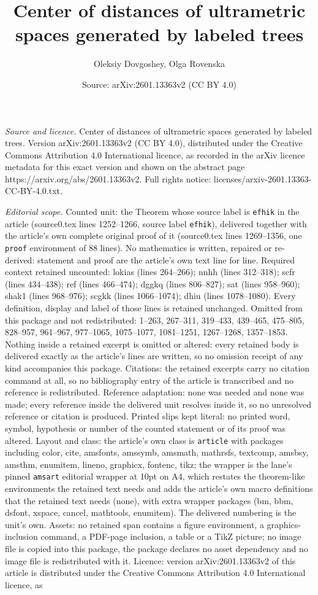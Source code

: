 \documentclass[10pt,a4paper]{amsart}
\title[Center of distances of ultrametric spaces generated by label]{Center of distances of ultrametric spaces generated by labeled trees}
\author{Oleksiy Dovgoshey, Olga Rovenska}
\date{Source: arXiv:2601.13363v2 (CC BY 4.0)}
\begin{document}
\maketitle

\noindent\emph{Source and licence.} Center of distances of ultrametric spaces generated by labeled trees. Version arXiv:2601.13363v2 (CC BY 4.0), distributed under the Creative Commons Attribution 4.0 International licence, as recorded in the arXiv licence metadata for this exact version and shown on the abstract page https://arxiv.org/abs/2601.13363v2. Full rights notice: licenses/arxiv-2601.13363-CC-BY-4.0.txt.\par\smallskip

\noindent\textit{Editorial scope.} Counted unit: the Theorem whose source label is \texttt{efhik} in the article (source0.tex lines 1252--1266, source label \texttt{efhik}), delivered together with the article's own complete original proof of it (source0.tex lines 1269--1356, one \texttt{proof} environment of 88 lines). No mathematics is written, repaired or re-derived: statement and proof are the article's own text line for line. Required context retained uncounted: lokias (lines 264--266); nnhh (lines 312--318); scfr (lines 434--438); ref (lines 466--474); dggkq (lines 806--827); sat (lines 958--960); shak1 (lines 968--976); scgkk (lines 1066--1074); dhiu (lines 1078--1080). Every definition, display and label of those lines is retained unchanged. Omitted from this package and not redistributed: 1--263, 267--311, 319--433, 439--465, 475--805, 828--957, 961--967, 977--1065, 1075--1077, 1081--1251, 1267--1268, 1357--1853. Nothing inside a retained excerpt is omitted or altered: every retained body is delivered exactly as the article's lines are written, so no omission receipt of any kind accompanies this package. Citations: the retained excerpts carry no citation command at all, so no bibliography entry of the article is transcribed and no reference is redistributed. Reference adaptation: none was needed and none was made; every reference inside the delivered unit resolves inside it, so no unresolved reference or citation is produced. Printed slips kept literal: no printed word, symbol, hypothesis or number of the counted statement or of its proof was altered. Layout and class: the article's own class is \texttt{article} with packages including color, cite, amsfonts, amssymb, amsmath, mathrsfs, textcomp, amsbsy, amsthm, enumitem, lineno, graphicx, fontenc, tikz; the wrapper is the lane's pinned \texttt{amsart} editorial wrapper at 10pt on A4, which restates the theorem-like environments the retained text needs and adds the article's own macro definitions that the retained text needs (none), with extra wrapper packages (bm, bbm, dsfont, xspace, cancel, mathtools, enumitem). The delivered numbering is the unit's own. Assets: no retained span contains a figure environment, a graphics-inclusion command, a PDF-page inclusion, a table or a TikZ picture; no image file is copied into this package, the package declares no asset dependency and no image file is redistributed with it. Licence: version arXiv:2601.13363v2 of this article is distributed under the Creative Commons Attribution 4.0 International licence, as 
\end{document}
